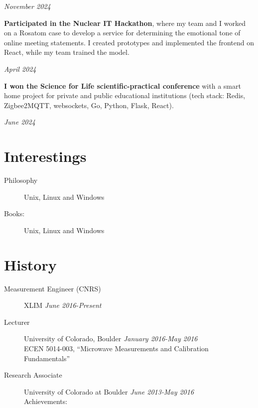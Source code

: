 \documentclass[margin,line]{resume}
\begin{document}
\begin{resume}
  \hfill \textsl{November 2024}

  \textbf{Participated in the Nuclear IT Hackathon}, where my team
  and I worked on a Rosatom case to develop a service for determining
  the emotional tone of online meeting statements. I created
  prototypes and implemented the frontend on React, while my team
  trained the model.
  \vspace{-6mm}

  \hfill \textsl{April 2024}

  \textbf{I won the Science for Life scientific-practical
  conference} with a smart home project for private and public
  educational institutions (tech stack: Redis, Zigbee2MQTT,
  websockets, Go, Python, Flask, React).
  \vspace{-6mm}

  \hfill \textsl{June 2024}

  \section{\mysidestyle Interestings}\vspace{2mm}
  \begin{description}
    \item[Philosophy] Unix, Linux and Windows
    \item[Books:] Unix, Linux and Windows
  \end{description}

  \vfill

  \section{\mysidestyle History}\vspace{2mm}

  \begin{description}

    \item[Measurement Engineer (CNRS)]\small{XLIM \hfill \textsl{June
      2016-Present}}\\
    \item[Lecturer]\small{University of Colorado, Boulder \hfill
      \textsl{January 2016-May 2016}}\\
      ECEN 5014-003, ``Microwave Measurements and Calibration Fundamentals''
      \vspace{2mm}

    \item[Research Associate]\small{University of Colorado at Boulder
      \hfill \textsl{June 2013-May 2016}}\\
      Achievements:
      \vspace{2mm}


\end{description}
\end{resume}
\end{document}
